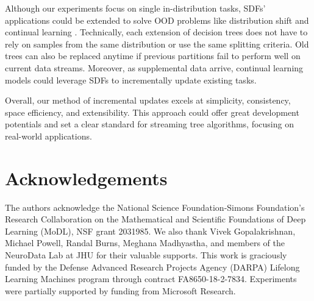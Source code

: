 Although our experiments focus on single in-distribution tasks, SDFs' applications could be extended to solve OOD problems like distribution shift and continual learning \citep{geisa_towards_2021, van_de_ven_three_2019}. 
Technically, each extension of decision trees does not have to rely on samples from the same distribution or use the same splitting criteria. Old trees can also be replaced anytime if previous partitions fail to perform well on current data streams. Moreover, as supplemental data arrive, continual learning models could leverage SDFs to incrementally update existing tasks.

Overall, our method of incremental updates excels at simplicity, consistency, space efficiency, and extensibility. This approach could offer great development potentials and set a clear standard for streaming tree algorithms, focusing on real-world applications.

\section*{Acknowledgements}
The authors acknowledge the National Science Foundation-Simons Foundation’s Research Collaboration on the Mathematical and Scientific Foundations of Deep Learning (MoDL), NSF grant 2031985. We also thank Vivek Gopalakrishnan, Michael Powell, Randal Burns, Meghana Madhyastha, and members of the NeuroData Lab at JHU for their valuable supports. This work is graciously funded by the Defense Advanced Research Projects Agency (DARPA) Lifelong Learning Machines program through contract FA8650-18-2-7834. Experiments were partially supported by funding from Microsoft Research.